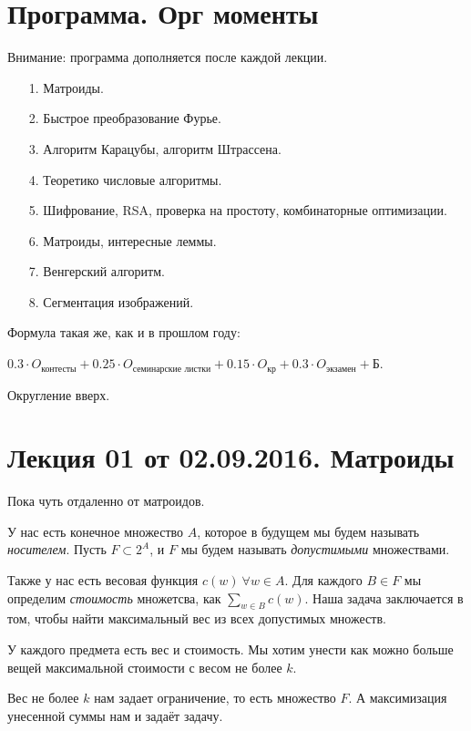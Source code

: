 \documentclass[a4paper, 12pt]{article}
\begin{document}
\pagestyle{fancy}

\section{Программа. Орг моменты}

Внимание: программа дополняется после каждой лекции.
\begin{itemize}
  \item[1.] Матроиды.
  \item[2.] Быстрое преобразование Фурье.
  \item[3.] Алгоритм Карацубы, алгоритм Штрассена.
  \item[4.] Теоретико числовые алгоритмы.
  \item[5.] Шифрование, RSA, проверка на простоту, комбинаторные 
  оптимизации.
  \item[6.] Матроиды, интересные леммы.
  \item[7.] Венгерский алгоритм.
  \item[8.] Сегментация изображений.
\end{itemize}

Формула такая же, как и в прошлом году: 

$0.3\cdot O_{\text{контесты}} + 0.25
\cdot O_{\text{семинарские листки}} + 0.15 \cdot O_{\text{кр}} + 0.3\cdot 
O_{\text{экзамен}} + \text{Б}$.

 Округление вверх.

\section{Лекция 01 от 02.09.2016. Матроиды}

Пока чуть отдаленно от матроидов.

У нас есть конечное множество $A$, которое в будущем мы будем называть 
\textit{носителем}. Пусть $F \subset 2^{A}$, и $F$ мы будем называть 
\textit{допустимыми} множествами.

Также у нас есть весовая функция $c(w) \ \forall w \in A$. 
Для каждого $B \in F$ мы определим \textit{стоимость} 
множетсва, как $\sum\limits_{w \in B} c(w)$. Наша задача 
заключается в том, чтобы найти максимальный вес из всех допустимых множеств.

\begin{Examples}
У каждого предмета есть вес и стоимость. Мы хотим унести как можно больше 
вещей максимальной стоимости с весом не более $k$.

Вес не более $k$ нам задает ограничение, то есть множество $F$.
А максимизация унесенной суммы нам и задаёт задачу.
\end{Examples}
\end{document}

